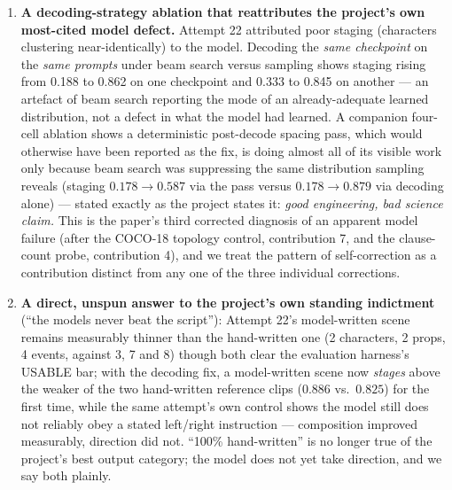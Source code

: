 \documentclass[11pt]{article}
\begin{document}
\begin{enumerate}
\item \textbf{A decoding-strategy ablation that reattributes the
  project's own most-cited model defect.} Attempt 22 attributed poor
  staging (characters clustering near-identically) to the model. Decoding
  the \emph{same checkpoint} on the \emph{same prompts} under beam search
  versus sampling shows staging rising from 0.188 to 0.862 on one
  checkpoint and 0.333 to 0.845 on another --- an artefact of beam search
  reporting the mode of an already-adequate learned distribution, not a
  defect in what the model had learned. A companion four-cell ablation
  shows a deterministic post-decode spacing pass, which would otherwise
  have been reported as the fix, is doing almost all of its visible work
  only because beam search was suppressing the same distribution sampling
  reveals (staging $0.178 \rightarrow 0.587$ via the pass versus $0.178
  \rightarrow 0.879$ via decoding alone) --- stated exactly as the project
  states it: \emph{good engineering, bad science claim.} This is the
  paper's third corrected diagnosis of an apparent model failure (after
  the COCO-18 topology control, contribution 7, and the clause-count
  probe, contribution 4), and we treat the pattern of self-correction as a
  contribution distinct from any one of the three individual corrections.

\item \textbf{A direct, unspun answer to the project's own standing
  indictment} (``the models never beat the script''): Attempt 22's
  model-written scene remains measurably thinner than the hand-written one
  (2 characters, 2 props, 4 events, against 3, 7 and 8) though both clear
  the evaluation harness's USABLE bar; with the decoding fix, a
  model-written scene now \emph{stages} above the weaker of the two
  hand-written reference clips ($0.886$ vs.\ $0.825$) for the first time,
  while the same attempt's own control shows the model still does not
  reliably obey a stated left/right instruction --- composition improved
  measurably, direction did not. ``100\% hand-written'' is no longer true
  of the project's best output category; the model does not yet take
  direction, and we say both plainly.


\end{enumerate}
\end{document}
